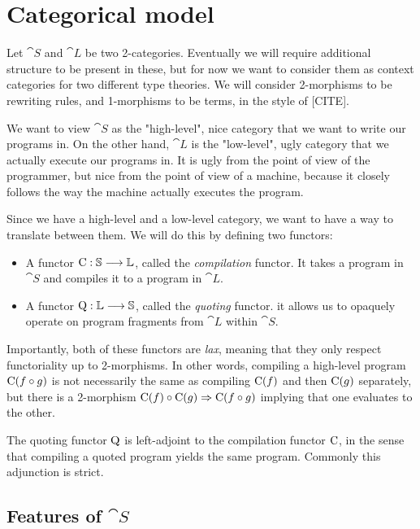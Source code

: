 \section{Categorical model}

Let $\cat S$ and $\cat L$ be two 2-categories. Eventually we will require
additional structure to be present in these, but for now we want to consider
them as context categories for two different type theories. We will consider
2-morphisms to be rewriting rules, and 1-morphisms to be terms, in the style of
  [CITE].

We want to view $\cat S$ as the "high-level", nice category that we want to
write our programs in. On the other hand, $\cat L$ is the "low-level", ugly
category that we actually execute our programs in. It is ugly from the point of
view of the programmer, but nice from the point of view of a machine, because
it closely follows the way the machine actually executes the program.

Since we have a high-level and a low-level category, we want to have a way to
translate between them. We will do this by defining two functors:
\begin{itemize}
  \item A functor $\mathrm C : \mathbb S \longrightarrow \mathbb L $, called the \emph{compilation}
        functor. It takes a program in $\cat S$ and compiles it to a program in $\cat
          L$.
  \item A functor $\mathrm Q : \mathbb L \longrightarrow \mathbb S $, called the \emph{quoting}
        functor. it allows us to opaquely operate on program fragments from $\cat L$
        within $\cat S$.
\end{itemize}

Importantly, both of these functors are \emph{lax}, meaning that they only
respect functoriality up to 2-morphisms. In other words, compiling a high-level
program $\mathrm C(f \circ g)$ is not necessarily the same as compiling $\mathrm
  C(f)$ and then $\mathrm C(g)$ separately, but there is a 2-morphism $\mathrm C(f)
  \circ \mathrm C(g) \Rightarrow \mathrm C(f \circ g)$ implying that one evaluates to
the other.

The quoting functor $\mathrm Q$ is left-adjoint to the compilation functor $\mathrm
  C$, in the sense that compiling a quoted program yields the same program.
Commonly this adjunction is strict.

\subsection{Features of $\cat S$}

